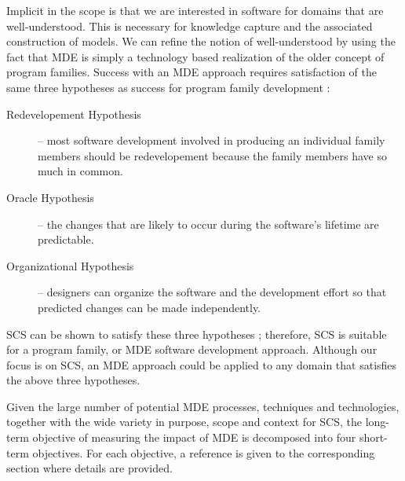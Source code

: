 \documentclass[12pt]{article}
\begin{document}
Implicit in the scope is that we are interested in software for domains that are
well-understood.  This is necessary for knowledge capture and the associated
construction of models.  We can refine the notion of well-understood by using
the fact that MDE is simply a technology based realization of the older concept
of program families.  Success with an MDE approach requires
satisfaction of the same three hypotheses as success for program family
development \citep{Weiss1997}:

\begin{description}
\item [Redevelopement Hypothesis] -- most software development involved in
  producing an individual family members should be redevelopement because the
  family members have so much in common. 

\item[Oracle Hypothesis] -- the changes that are likely to occur during the
  software's lifetime are predictable.

\item [Organizational Hypothesis] -- designers can organize the software and the
  development effort so that predicted changes can be made independently.
\end{description}

SCS can be shown to satisfy these three hypotheses \citep{SmithAndChen2004,
  SmithMcCutchanAndCao2007}; therefore, SCS is suitable for a program family, or
MDE software development approach.  Although our focus is on SCS, an MDE
approach could be applied to any domain that satisfies the above three
hypotheses.

Given the large number of potential MDE processes, techniques and technologies,
together with the wide variety in purpose, scope and context for SCS, the
long-term objective of measuring the impact of MDE is decomposed into four
short-term objectives.  For each objective, a reference is given to the
corresponding section where details are provided.
\end{document}
